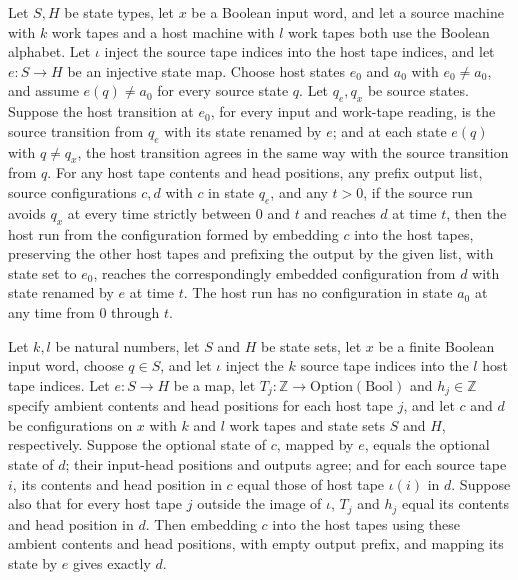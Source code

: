 \begin{lemma}
\label{Turing.FinTM.emitterP2_call_phase}
\leanok
{}
Let $S,H$ be state types, let $x$ be a Boolean input word, and let a source machine with
$k$ work tapes and a host machine with $l$ work tapes both use the Boolean alphabet. Let
$\iota$ inject the source tape indices into the host tape indices, and let $e:S\to H$ be
an injective state map. Choose host states $e_0$ and $a_0$ with $e_0\ne a_0$, and assume
$e(q)\ne a_0$ for every source state $q$. Let $q_e,q_x$ be source states. Suppose the
host transition at $e_0$, for every input and work-tape reading, is the source
transition from $q_e$ with its state renamed by $e$; and at each state $e(q)$ with $q\ne
q_x$, the host transition agrees in the same way with the source transition from $q$.
For any host tape contents and head positions, any prefix output list, source
configurations $c,d$ with $c$ in state $q_e$, and any $t>0$, if the source run avoids
$q_x$ at every time strictly between $0$ and $t$ and reaches $d$ at time $t$, then the
host run from the configuration formed by embedding $c$ into the host tapes, preserving
the other host tapes and prefixing the output by the given list, with state set to
$e_0$, reaches the correspondingly embedded configuration from $d$ with state renamed by
$e$ at time $t$. The host run has no configuration in state $a_0$ at any time from $0$
through $t$.
\end{lemma}

\begin{lemma}
\label{Turing.FinTM.emitterP2_frame}
\leanok
{}
Let $k,l$ be natural numbers, let $S$ and $H$ be state sets, let $x$ be a finite Boolean
input word, choose $q\in S$, and let $\iota$ inject the $k$ source tape indices into the
$l$ host tape indices. Let $e:S\to H$ be a map, let
$T_j:\mathbb{Z}\to\mathrm{Option}(\mathrm{Bool})$ and $h_j\in\mathbb{Z}$ specify ambient
contents and head positions for each host tape $j$, and let $c$ and $d$ be
configurations on $x$ with $k$ and $l$ work tapes and state sets $S$ and $H$,
respectively. Suppose the optional state of $c$, mapped by $e$, equals the optional
state of $d$; their input-head positions and outputs agree; and for each source tape
$i$, its contents and head position in $c$ equal those of host tape $\iota(i)$ in $d$.
Suppose also that for every host tape $j$ outside the image of $\iota$, $T_j$ and $h_j$
equal its contents and head position in $d$. Then embedding $c$ into the host tapes
using these ambient contents and head positions, with empty output prefix, and mapping
its state by $e$ gives exactly $d$.
\end{lemma}

